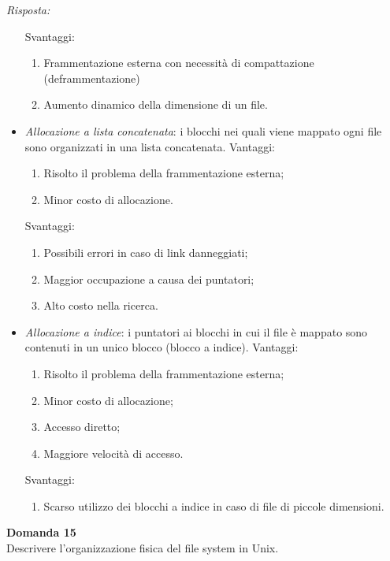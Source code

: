 \documentclass{article}
\newenvironment{problem}[2][Domanda]
    { \begin{mdframed}[backgroundcolor=gray!20] \textbf{#1 #2} \\}
    {  \end{mdframed}}
\newenvironment{solution}
    {\textit{Risposta:}}
    {}
\begin{document}
\begin{solution}
\begin{itemize}
\begin{enumerate}
    \end{enumerate}
    Svantaggi:
    \begin{enumerate}
        \item Frammentazione esterna con necessità di compattazione (deframmentazione)
        \item Aumento dinamico della dimensione di un file.
    \end{enumerate}
    \item \emph{Allocazione a lista concatenata}: i blocchi nei quali viene mappato ogni file sono organizzati in una lista concatenata.
    \newline
    \newline
  Vantaggi:
  \begin{enumerate}
      \item Risolto il problema della frammentazione esterna;
      \item Minor costo di allocazione.
  \end{enumerate}
  Svantaggi:
  \begin{enumerate}
      \item Possibili errori in caso di link danneggiati;
      \item Maggior occupazione a causa dei puntatori;
      \item Alto costo nella ricerca.
  \end{enumerate}
  \item \emph{Allocazione a indice}: i puntatori ai blocchi in cui il file è mappato sono contenuti in un unico blocco (blocco a indice).
  \newline
  \newline
  Vantaggi:
  \begin{enumerate}
      \item Risolto il problema della frammentazione esterna;
      \item Minor costo di allocazione;
      \item Accesso diretto;
      \item Maggiore velocità di accesso.
  \end{enumerate}
  Svantaggi:
  \begin{enumerate}
      \item Scarso utilizzo dei blocchi a indice in caso di file di piccole dimensioni.
  \end{enumerate}
\end{itemize} 
\end{solution}
\begin{problem}{15}
Descrivere l'organizzazione fisica del file system in Unix.
\end{problem}
\end{document}
